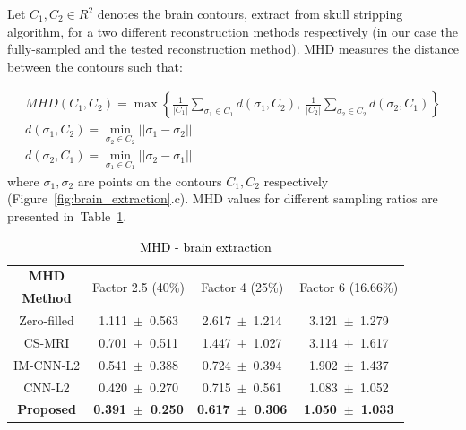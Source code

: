 \documentclass[review]{elsarticle}
\begin{document}
Let $C_1,C_2\in R^2$ denotes the brain contours, extract from skull stripping algorithm, for a two different reconstruction methods respectively (in our case the fully-sampled and the tested reconstruction method). MHD measures the distance between the contours such that:

\begin{equation}
\begin{array}{cc}
MHD(C_1,C_2) = \max \left\{\frac{1}{|C_1|} \sum_{\sigma_{1}\in C_1}^{}d(\sigma_1,C_2), ~ \frac{1}{|C_2|} \sum_{\sigma_{2}\in C_2}^{}d(\sigma_2,C_1)\right\} \\
d(\sigma_1,C_2) = \underset{\sigma_{2}\in C_{2}}{\min}||\sigma_1-\sigma_2|| \\
d(\sigma_2,C_1) = \underset{\sigma_{1}\in C_{1}}{\min}||\sigma_2-\sigma_1||
\end{array}
\end{equation}
where $\sigma_1,\sigma_2$ are points on the contours $C_1,C_2$ respectively (Figure~\ref{fig:brain_extraction}.c). MHD values for different sampling ratios are presented in~Table~\ref{tbl:MHD}.

\begin{table}[H]
	\centering{}
	\begin{tabular}{|c||c||c||c|}
		\hline 
		\textbf{MHD} & \multicolumn{1}{c||}{\multirow{2}{*}{Factor 2.5 (40\%)}} & \multicolumn{1}{c||}{\multirow{2}{*}{Factor 4 (25\%)}} & \multicolumn{1}{c|}{\multirow{2}{*}{Factor 6 (16.66\%)}} \tabularnewline
		\textbf{Method} & \multicolumn{1}{c||}{} & \multicolumn{1}{c||}{} & \multicolumn{1}{c|}{} \tabularnewline \cline{1-4}
				
		Zero-filled         &1.111~$\pm$~0.563  &2.617~$\pm$~1.214   &3.121~$\pm$~1.279\tabularnewline
		CS-MRI              &0.701~$\pm$~0.511  &1.447~$\pm$~1.027   &3.114~$\pm$~1.617\tabularnewline
		IM-CNN-L2           &0.541~$\pm$~0.388  &0.724~$\pm$~0.394   &1.902~$\pm$~1.437\tabularnewline
		CNN-L2              &0.420~$\pm$~0.270  &0.715~$\pm$~0.561   &1.083~$\pm$~1.052\tabularnewline
		\textbf{Proposed}   &\textbf{0.391~$\pm$~0.250}  &\textbf{0.617~$\pm$~0.306}   &\textbf{1.050~$\pm$~1.033}\tabularnewline
		\hline 
	\end{tabular}\caption{\textcolor{black}{\footnotesize{}{}MHD - brain extraction}{\footnotesize{}\label{tbl:MHD}}}
\end{table}
\end{document}
